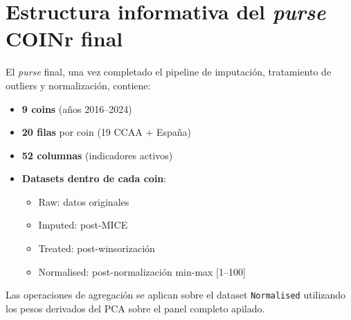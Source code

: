 \section{Estructura informativa del \emph{purse} COINr final}

El \emph{purse} final, una vez completado el pipeline de imputación, tratamiento de outliers y normalización, contiene:

\begin{itemize}
    \item \textbf{9 coins} (años 2016--2024)
    \item \textbf{20 filas} por coin (19 CCAA + España)
    \item \textbf{52 columnas} (indicadores activos)
    \item \textbf{Datasets dentro de cada coin}:
    \begin{itemize}
        \item Raw: datos originales
        \item Imputed: post-MICE
        \item Treated: post-winsorización
        \item Normalised: post-normalización min-max [1--100]
    \end{itemize}
\end{itemize}

Las operaciones de agregación se aplican sobre el dataset \texttt{Normalised} utilizando los pesos derivados del PCA sobre el panel completo apilado.


